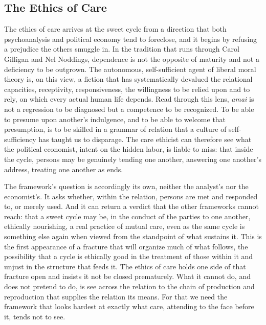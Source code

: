 \documentclass[11pt,a4paper]{article}
\begin{document}
\subsection{The Ethics of Care}

The ethics of care arrives at the sweet cycle from a direction that both psychoanalysis and political economy tend to foreclose, and it begins by refusing a prejudice the others smuggle in. In the tradition that runs through Carol Gilligan and Nel Noddings, dependence is not the opposite of maturity and not a deficiency to be outgrown. The autonomous, self-sufficient agent of liberal moral theory is, on this view, a fiction that has systematically devalued the relational capacities, receptivity, responsiveness, the willingness to be relied upon and to rely, on which every actual human life depends. Read through this lens, \textit{amai} is not a regression to be diagnosed but a competence to be recognized. To be able to presume upon another's indulgence, and to be able to welcome that presumption, is to be skilled in a grammar of relation that a culture of self-sufficiency has taught us to disparage. The care ethicist can therefore see what the political economist, intent on the hidden labor, is liable to miss: that inside the cycle, persons may be genuinely tending one another, answering one another's address, treating one another as ends.

The framework's question is accordingly its own, neither the analyst's nor the economist's. It asks whether, within the relation, persons are met and responded to, or merely used. And it can return a verdict that the other frameworks cannot reach: that a sweet cycle may be, in the conduct of the parties to one another, ethically nourishing, a real practice of mutual care, even as the same cycle is something else again when viewed from the standpoint of what sustains it. This is the first appearance of a fracture that will organize much of what follows, the possibility that a cycle is ethically good in the treatment of those within it and unjust in the structure that feeds it. The ethics of care holds one side of that fracture open and insists it not be closed prematurely. What it cannot do, and does not pretend to do, is see across the relation to the chain of production and reproduction that supplies the relation its means. For that we need the framework that looks hardest at exactly what care, attending to the face before it, tends not to see.
\end{document}
